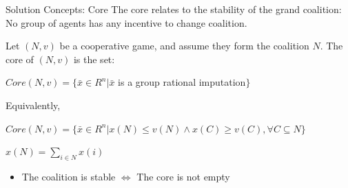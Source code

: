 \documentclass{beamer}
\begin{document}
\begin{frame} {Solution Concepts: Core}
    The core relates to the stability of the grand coalition: \\ No group of agents has any incentive to change coalition.
    \begin{definition}\label{dfn:core}
        Let $(N,v)$ be a cooperative game, and assume they form the coalition $N$. The core of $(N,v)$ is the set:
        \vspace{0.1cm}
        \begin{center}
            $Core(N,v) = \{\bar{x} \in R^n | \bar{x}$ is a group rational imputation$\}$
        \end{center}
        Equivalently,
        \vspace{0.1cm}
        \begin{center}
            $Core(N,v) = \{\bar{x} \in R^n | x(N) \leq v(N) \wedge x(C) \geq v(C), \forall C \subseteq N\}$ \\
        \end{center}
        \small{$x(N) = \sum_{i \in N} x(i)$}
    \end{definition}

    \begin{itemize}
       \item The coalition is stable $\Leftrightarrow$ The core is not empty
    \end{itemize}

\end{frame}
%
%
%
%
\end{document}
